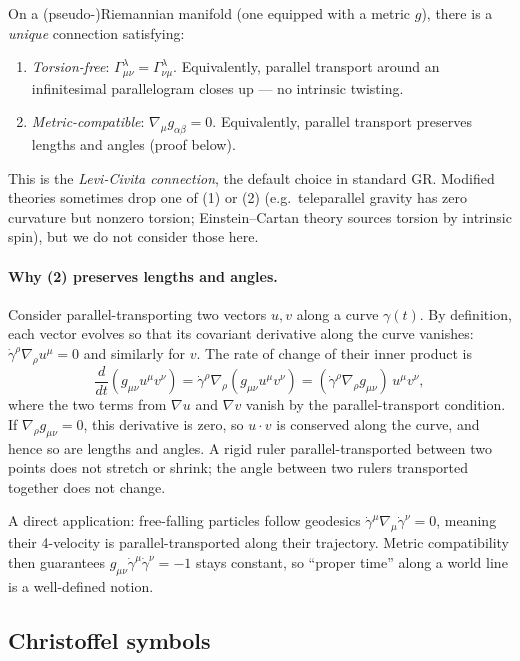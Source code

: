 \documentclass[12pt]{article}
\begin{document}
On a (pseudo-)Riemannian manifold (one equipped with a metric $g$),
there is a \emph{unique} connection satisfying:
\begin{enumerate}
  \item \emph{Torsion-free}:
    $\Gamma^\lambda_{\mu\nu} = \Gamma^\lambda_{\nu\mu}$.
    Equivalently, parallel transport around an infinitesimal
    parallelogram closes up --- no intrinsic twisting.
  \item \emph{Metric-compatible}:
    $\nabla_\mu g_{\alpha\beta} = 0$.
    Equivalently, parallel transport preserves lengths and angles
    (proof below).
\end{enumerate}
This is the \emph{Levi-Civita connection}, the default choice in
standard GR.  Modified theories sometimes drop one of (1) or (2)
(e.g.\ teleparallel gravity has zero curvature but nonzero torsion;
Einstein--Cartan theory sources torsion by intrinsic spin), but we
do not consider those here.

\paragraph{Why (2) preserves lengths and angles.}
Consider parallel-transporting two vectors $u,v$ along a curve
$\gamma(t)$.  By definition, each vector evolves so that its
covariant derivative along the curve vanishes:
$\dot\gamma^\rho\nabla_\rho u^\mu = 0$ and similarly for $v$.  The
rate of change of their inner product is
%
\begin{equation}
  \frac{d}{dt}(g_{\mu\nu}u^\mu v^\nu)
  = \dot\gamma^\rho\nabla_\rho(g_{\mu\nu}u^\mu v^\nu)
  = (\dot\gamma^\rho\nabla_\rho g_{\mu\nu})\,u^\mu v^\nu,
\end{equation}
%
where the two terms from $\nabla u$ and $\nabla v$ vanish by the
parallel-transport condition.  If $\nabla_\rho g_{\mu\nu} = 0$, this
derivative is zero, so $u\cdot v$ is conserved along the curve, and
hence so are lengths and angles.  A rigid ruler parallel-transported
between two points does not stretch or shrink; the angle between two
rulers transported together does not change.

A direct application: free-falling particles follow geodesics
$\dot\gamma^\mu\nabla_\mu\dot\gamma^\nu = 0$, meaning their 4-velocity
is parallel-transported along their trajectory.  Metric compatibility
then guarantees $g_{\mu\nu}\dot\gamma^\mu\dot\gamma^\nu = -1$ stays
constant, so ``proper time'' along a world line is a well-defined
notion.

\subsection{Christoffel symbols}
\label{app:christoffel}
\end{document}
